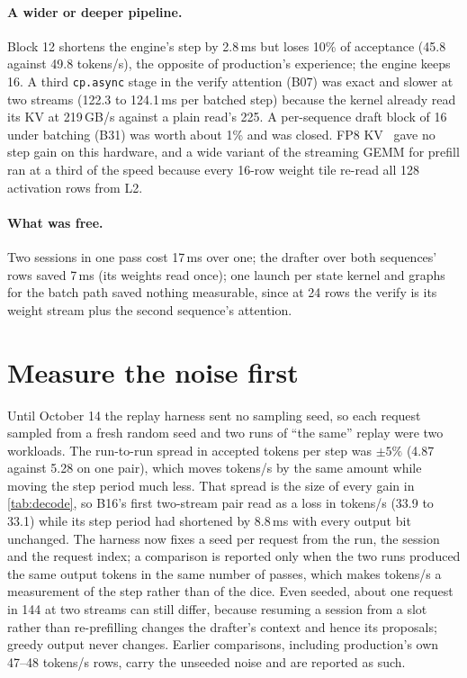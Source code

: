 \documentclass[11pt]{article}
\newcommand{\code}[1]{\texttt{#1}}
\begin{document}
\paragraph{A wider or deeper pipeline.}
Block 12 shortens the engine's step by 2.8\,ms but loses 10\% of acceptance (45.8 against 49.8 tokens/s), the opposite of
production's experience; the engine keeps 16. A third \code{cp.async} stage in the verify attention (B07) was exact and
slower at two streams (122.3 to 124.1\,ms per batched step) because the kernel already read its KV at 219\,GB/s against a
plain read's 225. A per-sequence draft block of 16 under batching (B31) was worth about 1\% and was closed. FP8 KV~\cite{hooper2024kvquant} gave no
step gain on this hardware, and a wide variant of the streaming GEMM for prefill ran at a third of the speed because every
16-row weight tile re-read all 128 activation rows from L2.

\paragraph{What was free.}
Two sessions in one pass cost 17\,ms over one; the drafter over both sequences' rows saved 7\,ms (its weights read once);
one launch per state kernel and graphs for the batch path saved nothing measurable, since at 24 rows the verify is its
weight stream plus the second sequence's attention.

\section{Measure the noise first}
\label{sec:noise}

Until October 14 the replay harness sent no sampling seed, so each request sampled from a fresh random seed and two runs
of ``the same'' replay were two workloads. The run-to-run spread in accepted tokens per step was $\pm5\%$ (4.87 against
5.28 on one pair), which moves tokens/s by the same amount while moving the step period much less. That spread is the
size of every gain in \cref{tab:decode}, so B16's first two-stream pair read as a loss in tokens/s (33.9 to 33.1) while
its step period had shortened by 8.8\,ms with every output bit unchanged. The harness now fixes a seed per request from
the run, the session and the request index; a comparison is reported only when the two runs produced the same output
tokens in the same number of passes, which makes tokens/s a measurement of the step rather than of the dice. Even seeded,
about one request in 144 at two streams can still differ, because resuming a session from a slot rather than re-prefilling
changes the drafter's context and hence its proposals; greedy output never changes. Earlier comparisons, including
production's own 47--48 tokens/s rows, carry the unseeded noise and are reported as such.
\end{document}

